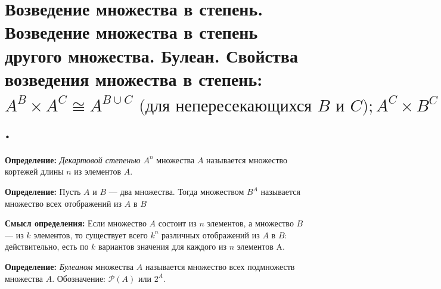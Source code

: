 \setcounter{section}{10}

\section{Возведение множества в степень. Возведение множества в степень другого множества. Булеан. Свойства возведения множества в степень: $A^B \times A^C \cong A^{B \cup C} \mbox{ (для непересекающихся $B$ и $C$)}; A^C \times B^C \cong (A \times B)^C; (A^B)^C \cong A^{B \times C} \mbox{(для произвольных $A$, $B$, $C$)}$.}
\par  \textbf{Определение: }\textit{Декартовой степенью} $A^n$ множества $A$ называется множество кортежей длины $n$ из элементов $A$.
\par \textbf{Определение: }Пусть $A$ и $B$ — два множества. Тогда множеством $B^A$ называется множество всех отображений из $A$ в $B$
\par \textbf{Смысл определения:} Если множество $A$ состоит из $n$ элементов, а множество $B$ — из $k$ элементов, то существует всего $k^n$ различных отображений из $A$ в $B$: действительно, есть по $k$ вариантов значения для каждого из $n$ элементов A.
\par \textbf{Определение: }\textit{Булеаном} множества $A$ называется множество всех подмножеств
множества $A$. Обозначение: $\mathcal{P}(A)$ или $2^A$.
